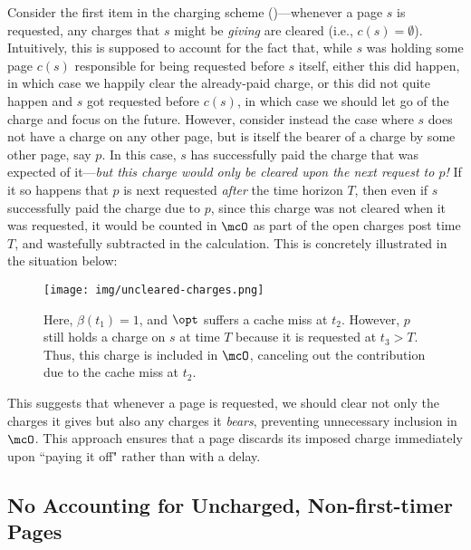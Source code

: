 Consider the first item in the charging scheme ()---whenever a page $s$ is requested, any charges that $s$ might be \textit{giving} are cleared (i.e., $c(s)=\emptyset$). Intuitively, this is supposed to account for the fact that, while $s$ was holding some page $c(s)$ responsible for being requested before $s$ itself, either this did happen, in which case we happily clear the already-paid charge, or this did not quite happen and $s$ got requested before $c(s)$, in which case we should let go of the charge and focus on the future. However, consider instead the case where $s$ does not have a charge on any other page, but is itself the bearer of a charge by some other page, say $p$. In this case, $s$ has successfully paid the charge that was expected of it---\textit{but this charge would only be cleared upon the next request to $p$!} If it so happens that $p$ is next requested \textit{after} the time horizon $T$, then even if $s$ successfully paid the charge due to $p$, since this charge was not cleared when it was requested, it would be counted in $\mcO$ as part of the open charges post time $T$, and wastefully subtracted in the calculation. This is concretely illustrated in the situation below:
\begin{figure}[H]
    \centering
    \texttt{[image: img/uncleared-charges.png]}
    \caption{Here, $\beta(t_1)=1$, and $\opt$ suffers a cache miss at $t_2$. However, $p$ still holds a charge on $s$ at time $T$ because it is requested at $t_3 > T$. Thus, this charge is included in $\mcO$, canceling out the contribution due to the cache miss at $t_2$.}
    \label{fig:uncleared-charges}
\end{figure}
This suggests that whenever a page is requested, we should clear not only the charges it gives but also any charges it {\em bears}, preventing unnecessary inclusion in $\mcO$. This approach ensures that a page discards its imposed charge immediately upon ``paying it off" rather than with a delay.

\subsection{No Accounting for Uncharged, Non-first-timer Pages}
\label{sec:looseness-uncharged-non-first-time}

